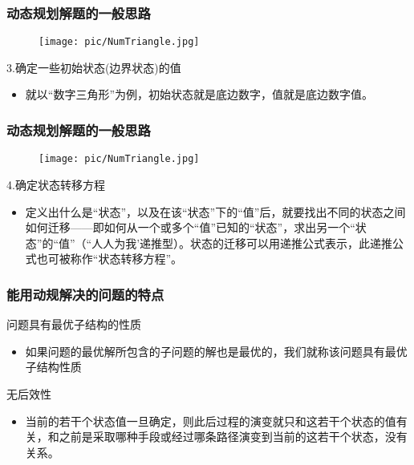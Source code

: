 \documentclass{beamer}
\begin{document}
\begin{frame}[fragile]
\frametitle{动态规划解题的一般思路}

\begin{minipage}[b]{0.30\linewidth}
\begin{figure}
\centering
\texttt{[image: pic/NumTriangle.jpg]}
\end{figure}

\end{minipage}
\hfill
\begin{minipage}[b]{0.65\linewidth}

\begin{block}{3.确定一些初始状态(边界状态)的值}
\begin{itemize}
	\item 就以“数字三角形”为例，初始状态就是底边数字，值就是底边数字值。
\end{itemize}
\end{block}
\end{minipage}
\end{frame}

\begin{frame}[fragile]
\frametitle{动态规划解题的一般思路}

\begin{minipage}[b]{0.30\linewidth}
	\begin{figure}
		\centering
		\texttt{[image: pic/NumTriangle.jpg]}
	\end{figure}
	
\end{minipage}
\hfill
\begin{minipage}[b]{0.65\linewidth}
	
	\begin{block}{4.确定状态转移方程}
		\begin{itemize}
			\item 定义出什么是“状态”，以及在该“状态”下的“值”后，就要找出不同的状态之间如何迁移——即如何从一个或多个“值”已知的“状态”，求出另一个“状态”的“值”（“人人为我’递推型）。状态的迁移可以用递推公式表示，此递推公式也可被称作“状态转移方程”。
		\end{itemize}
	\end{block}
\end{minipage}
\end{frame}

\begin{frame}[fragile]
\frametitle{能用动规解决的问题的特点}
\begin{block}{问题具有最优子结构的性质}
	\begin{itemize}
		\item 如果问题的最优解所包含的子问题的解也是最优的，我们就称该问题具有最优子结构性质
	\end{itemize}
\end{block}
\begin{block}{无后效性}
	\begin{itemize}
		\item 当前的若干个状态值一旦确定，则此后过程的演变就只和这若干个状态的值有关，和之前是采取哪种手段或经过哪条路径演变到当前的这若干个状态，没有关系。
	\end{itemize}
\end{block}
\end{frame}
\end{document}
